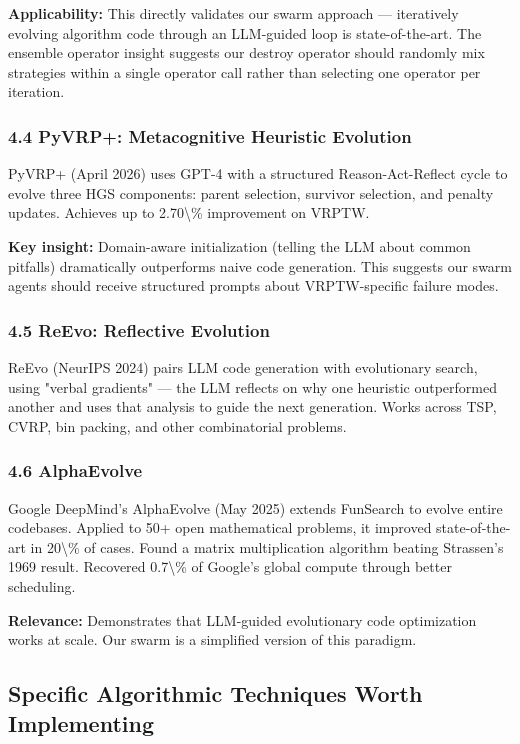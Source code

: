 \documentclass[twocolumn,10pt,letterpaper]{article}
\begin{document}
\textbf{Applicability:} This directly validates our swarm approach --- iteratively evolving algorithm code through an LLM-guided loop is state-of-the-art. The ensemble operator insight suggests our destroy operator should randomly mix strategies within a single operator call rather than selecting one operator per iteration.


\subsubsection{4.4 PyVRP+: Metacognitive Heuristic Evolution}

PyVRP+ (April 2026) uses GPT-4 with a structured Reason-Act-Reflect cycle to evolve three HGS components: parent selection, survivor selection, and penalty updates. Achieves up to 2.70\textbackslash{}\% improvement on VRPTW.


\textbf{Key insight:} Domain-aware initialization (telling the LLM about common pitfalls) dramatically outperforms naive code generation. This suggests our swarm agents should receive structured prompts about VRPTW-specific failure modes.


\subsubsection{4.5 ReEvo: Reflective Evolution}

ReEvo (NeurIPS 2024) pairs LLM code generation with evolutionary search, using "verbal gradients" --- the LLM reflects on why one heuristic outperformed another and uses that analysis to guide the next generation. Works across TSP, CVRP, bin packing, and other combinatorial problems.


\subsubsection{4.6 AlphaEvolve}

Google DeepMind's AlphaEvolve (May 2025) extends FunSearch to evolve entire codebases. Applied to 50+ open mathematical problems, it improved state-of-the-art in 20\textbackslash{}\% of cases. Found a matrix multiplication algorithm beating Strassen's 1969 result. Recovered 0.7\textbackslash{}\% of Google's global compute through better scheduling.


\textbf{Relevance:} Demonstrates that LLM-guided evolutionary code optimization works at scale. Our swarm is a simplified version of this paradigm.


\subsection{Specific Algorithmic Techniques Worth Implementing}
\end{document}
